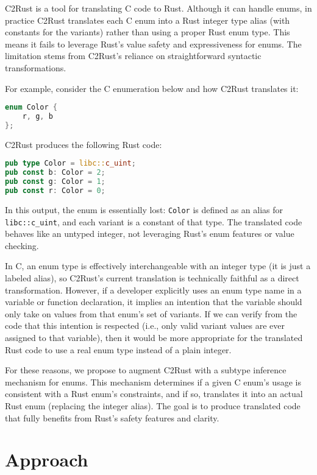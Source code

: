 \documentclass[10pt,conference]{IEEEtran}
\begin{document}
C2Rust is a tool for translating C code to Rust. Although it can handle enums, in practice C2Rust translates each C enum into a Rust integer type alias (with constants for the variants) rather than using a proper Rust enum type. This means it fails to leverage Rust's value safety and expressiveness for enums. The limitation stems from C2Rust's reliance on straightforward syntactic transformations.

For example, consider the C enumeration below and how C2Rust translates it:

\begin{lstlisting}[language=C]
enum Color {
    r, g, b
};
\end{lstlisting}

C2Rust produces the following Rust code:

\begin{lstlisting}[language=Rust]
pub type Color = libc::c_uint;
pub const b: Color = 2;
pub const g: Color = 1;
pub const r: Color = 0;
\end{lstlisting}

In this output, the enum is essentially lost: \texttt{Color} is defined as an alias for \texttt{libc::c\_uint}, and each variant is a constant of that type. The translated code behaves like an untyped integer, not leveraging Rust's enum features or value checking.

In C, an enum type is effectively interchangeable with an integer type (it is just a labeled alias), so C2Rust's current translation is technically faithful as a direct transformation. However, if a developer explicitly uses an enum type name in a variable or function declaration, it implies an intention that the variable should only take on values from that enum's set of variants. If we can verify from the code that this intention is respected (i.e., only valid variant values are ever assigned to that variable), then it would be more appropriate for the translated Rust code to use a real enum type instead of a plain integer.

For these reasons, we propose to augment C2Rust with a subtype inference mechanism for enums. This mechanism determines if a given C enum's usage is consistent with a Rust enum's constraints, and if so, translates it into an actual Rust enum (replacing the integer alias). The goal is to produce translated code that fully benefits from Rust's safety features and clarity.

\section{Approach}
\end{document}

